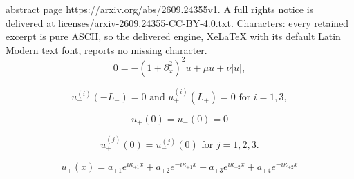 \documentclass[10pt,a4paper]{amsart}
\begin{document}
abstract page https://arxiv.org/abs/2609.24355v1. A full rights notice is delivered at licenses/arxiv-2609.24355-CC-BY-4.0.txt. Characters: every retained excerpt is pure ASCII, so the delivered engine, XeLaTeX with its default Latin Modern text font, reports no missing character.
		\begin{equation} \label{SH1}
			0 = - (1+\partial_x^2)^2 u + \mu u + \nu |u|, 
		\end{equation}

		\begin{equation}\label{neumann conditions}
			u_{-}^{(i)} (-L_{-})=0 \text{ and } u_{+}^{(i)} (L_{+})=0 \text{ for } i=1,3,
		\end{equation}

		\begin{equation}\label{matching condition}
			u_{+} (0)=u_{-} (0) =0
		\end{equation}

		\begin{equation}\label{smoothness condition}
			u_{+}^{(j)} (0)=u_{-}^{(j)} (0) \text{ for } j=1,2,3 .           	
		\end{equation}

		\begin{equation}\label{eq:u+-sol}
			u_\pm(x) = a_{\pm 1} e^{i \kappa_{\pm 1}x} +  a_{\pm 2} e^{-i \kappa_{\pm 1}x} +  a_{\pm 3} e^{i \kappa_{\pm 2}x} +  a_{\pm 4} e^{-i \kappa_{\pm 2}x}
		\end{equation}
\end{document}
